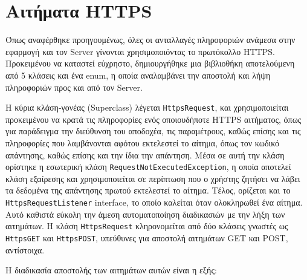 \section{Αιτήματα HTTPS}
	Όπως αναφέρθηκε προηγουμένως, όλες οι ανταλλαγές πληροφοριών ανάμεσα στην εφαρμογή και τον Server γίνονται χρησιμοποιόντας το πρωτόκολλο HTTPS. Προκειμένου να καταστεί εύχρηστο, δημιουργήθηκε μια βιβλιοθήκη αποτελούμενη από 5 κλάσεις και ένα enum, η οποία αναλαμβάνει την αποστολή και λήψη πληροφοριών προς και από τον Server.

	Η κύρια κλάση-γονέας (Superclass) λέγεται \verb|HttpsRequest|, και χρησιμοποιείται προκειμένου να κρατά τις πληροφορίες ενός οποιουδήποτε HTTPS αιτήματος, όπως για παράδειγμα την διεύθυνση του αποδοχέα, τις παραμέτρους, καθώς επίσης και τις πληροφορίες που λαμβάνονται αφότου εκτελεστεί το αίτημα, όπως τον κωδικό απάντησης, καθώς επίσης και την ίδια την απάντηση. Μέσα σε αυτή την κλάση ορίστηκε η εσωτερική κλάση \verb|RequestNotExecutedException|, η οποία αποτελεί κλάση εξαίρεσης και χρησιμοποιείται σε περίπτωση που ο χρήστης ζητήσει να λάβει τα δεδομένα της απάντησης πρωτού εκτελεστεί το αίτημα. Τέλος, ορίζεται και το \verb|HttpsRequestListener| interface, το οποίο καλείται όταν ολοκληρωθεί ένα αίτημα. Αυτό καθιστά εύκολη την άμεση αυτοματοποίηση διαδικασιών με την λήξη των αιτημάτων.	Η κλάση \verb|HttpsRequest| κληρονομείται από δύο κλάσεις γνωστές ως \verb|HttpsGET| και \verb|HttpsPOST|, υπεύθυνες για αποστολή αιτημάτων GET και POST, αντίστοιχα. 

	Η διαδικασία αποστολής των αιτημάτων αυτών είναι η εξής:

